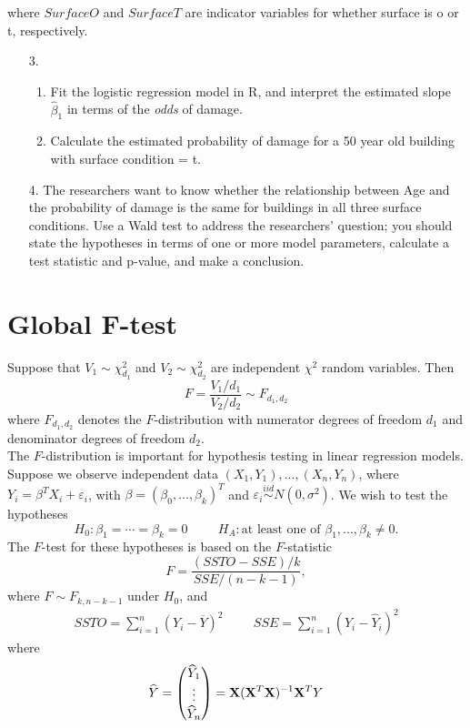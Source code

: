 \documentclass[11pt]{article}
\begin{document}
where $SurfaceO$ and $SurfaceT$ are indicator variables for whether surface is o or t, respectively.\\

\begin{enumerate}
\item[3.] 
\begin{enumerate}
\item Fit the logistic regression model in R, and interpret the estimated slope $\widehat{\beta}_1$ in terms of the \textit{odds} of damage.

\item Calculate the estimated probability of damage for a 50 year old building with surface condition = t.
\end{enumerate}

\item[4.] The researchers want to know whether the relationship between Age and the probability of damage is the same for buildings in all three surface conditions. Use a Wald test to address the researchers' question; you should state the hypotheses in terms of one or more model parameters, calculate a test statistic and p-value, and make a conclusion.

\end{enumerate}

\section*{Global F-test}

Suppose that $V_1 \sim \chi^2_{d_1}$ and $V_2 \sim \chi^2_{d_2}$ are independent $\chi^2$ random variables. Then 
$$F = \dfrac{V_1/d_1}{V_2/d_2} \sim F_{d_1, d_2}$$
where $F_{d_1, d_2}$ denotes the $F$-distribution with numerator degrees of freedom $d_1$ and denominator degrees of freedom $d_2$.\\

\noindent The $F$-distribution is important for hypothesis testing in linear regression models. Suppose we observe independent data $(X_1, Y_1),...,(X_n, Y_n)$, where $Y_i = \beta^T X_i + \varepsilon_i$, with $\beta = (\beta_0, ..., \beta_k)^T$ and $\varepsilon_i \overset{iid}{\sim} N(0, \sigma^2)$. We wish to test the hypotheses
$$H_0: \beta_1 = \cdots = \beta_k = 0 \hspace{1cm} H_A: \text{at least one of } \beta_1,...,\beta_k \neq 0.$$
The $F$-test for these hypotheses is based on the $F$-statistic
$$F = \dfrac{(SSTO - SSE)/k}{SSE/(n - k - 1)},$$
where $F \sim F_{k, n-k-1}$ under $H_0$, and
\begin{align*}
SSTO = \sum \limits_{i=1}^n (Y_i - \overline{Y})^2 \hspace{1cm} SSE = \sum \limits_{i=1}^n (Y_i - \widehat{Y}_i)^2
\end{align*}
where 
$$\widehat{Y} = \begin{pmatrix}
\widehat{Y}_1 \\ \vdots \\ \widehat{Y}_n
\end{pmatrix} = {\bf X}({\bf X}^T{\bf X})^{-1} {\bf X}^T Y$$
\end{document}
